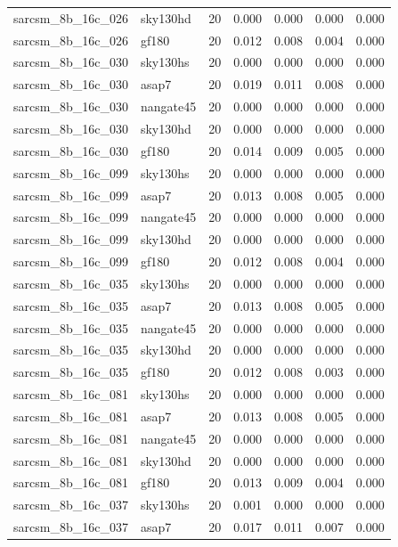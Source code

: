 \begin{tabular}{llrrrrr}
sarcsm\_8b\_16c\_026 & sky130hd & 20 & 0.000 & 0.000 & 0.000 & 0.000 \\
sarcsm\_8b\_16c\_026 & gf180 & 20 & 0.012 & 0.008 & 0.004 & 0.000 \\
sarcsm\_8b\_16c\_030 & sky130hs & 20 & 0.000 & 0.000 & 0.000 & 0.000 \\
sarcsm\_8b\_16c\_030 & asap7 & 20 & 0.019 & 0.011 & 0.008 & 0.000 \\
sarcsm\_8b\_16c\_030 & nangate45 & 20 & 0.000 & 0.000 & 0.000 & 0.000 \\
sarcsm\_8b\_16c\_030 & sky130hd & 20 & 0.000 & 0.000 & 0.000 & 0.000 \\
sarcsm\_8b\_16c\_030 & gf180 & 20 & 0.014 & 0.009 & 0.005 & 0.000 \\
sarcsm\_8b\_16c\_099 & sky130hs & 20 & 0.000 & 0.000 & 0.000 & 0.000 \\
sarcsm\_8b\_16c\_099 & asap7 & 20 & 0.013 & 0.008 & 0.005 & 0.000 \\
sarcsm\_8b\_16c\_099 & nangate45 & 20 & 0.000 & 0.000 & 0.000 & 0.000 \\
sarcsm\_8b\_16c\_099 & sky130hd & 20 & 0.000 & 0.000 & 0.000 & 0.000 \\
sarcsm\_8b\_16c\_099 & gf180 & 20 & 0.012 & 0.008 & 0.004 & 0.000 \\
sarcsm\_8b\_16c\_035 & sky130hs & 20 & 0.000 & 0.000 & 0.000 & 0.000 \\
sarcsm\_8b\_16c\_035 & asap7 & 20 & 0.013 & 0.008 & 0.005 & 0.000 \\
sarcsm\_8b\_16c\_035 & nangate45 & 20 & 0.000 & 0.000 & 0.000 & 0.000 \\
sarcsm\_8b\_16c\_035 & sky130hd & 20 & 0.000 & 0.000 & 0.000 & 0.000 \\
sarcsm\_8b\_16c\_035 & gf180 & 20 & 0.012 & 0.008 & 0.003 & 0.000 \\
sarcsm\_8b\_16c\_081 & sky130hs & 20 & 0.000 & 0.000 & 0.000 & 0.000 \\
sarcsm\_8b\_16c\_081 & asap7 & 20 & 0.013 & 0.008 & 0.005 & 0.000 \\
sarcsm\_8b\_16c\_081 & nangate45 & 20 & 0.000 & 0.000 & 0.000 & 0.000 \\
sarcsm\_8b\_16c\_081 & sky130hd & 20 & 0.000 & 0.000 & 0.000 & 0.000 \\
sarcsm\_8b\_16c\_081 & gf180 & 20 & 0.013 & 0.009 & 0.004 & 0.000 \\
sarcsm\_8b\_16c\_037 & sky130hs & 20 & 0.001 & 0.000 & 0.000 & 0.000 \\
sarcsm\_8b\_16c\_037 & asap7 & 20 & 0.017 & 0.011 & 0.007 & 0.000 \\

\end{tabular}
